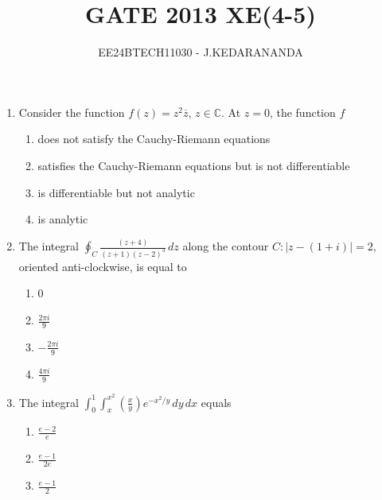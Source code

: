 \documentclass[journal]{IEEEtran}
\renewcommand{\thefigure}{\theenumi}
\renewcommand{\thetable}{\theenumi}
\numberwithin{equation}{enumi}
\numberwithin{figure}{enumi}
\renewcommand{\thetable}{\theenumi}
\begin{document}

\vspace{3cm}

\title{GATE 2013 XE(4-5)}
\author{EE24BTECH11030 - J.KEDARANANDA}
{\let\newpage\relax\maketitle}
\renewcommand{\thefigure}{\theenumi}
\renewcommand{\thetable}{\theenumi}
\begin{enumerate}
    
    \item Consider the function \( f(z) = z^2 \overline{z} \), \( z \in \mathbb{C} \). At \( z = 0 \), the function \( f \)
    \begin{enumerate}
        \item does not satisfy the Cauchy-Riemann equations
        \item satisfies the Cauchy-Riemann equations but is not differentiable
        \item is differentiable but not analytic
        \item is analytic
    \end{enumerate}
    \bigskip
    \item The integral \( \oint_C \frac{(z+4)}{(z+1)(z-2)^3} \, dz \) along the contour \( C : |z - (1 + i)| = 2 \), oriented anti-clockwise, is equal to
    \begin{multicols}{4}
    \begin{enumerate}
        \item 0
        \item \( \frac{2 \pi i}{9} \)
        \item \( -\frac{2 \pi i}{9} \)
        \item \( \frac{4 \pi i}{9} \)
    \end{enumerate}
    \end{multicols}
\bigskip
    \item The integral \( \int_0^1 \int_{x}^{x^2} \left( \frac{x}{y} \right) e^{-x^2/y} \, dy \, dx \) equals
    \begin{multicols}{4}
    \begin{enumerate}
        \item \( \frac{e - 2}{e} \)
        \item \( \frac{e - 1}{2e} \)
        \item \( \frac{e - 1}{2} \)

\end{enumerate}
\end{multicols}
\end{enumerate}
\end{document}
